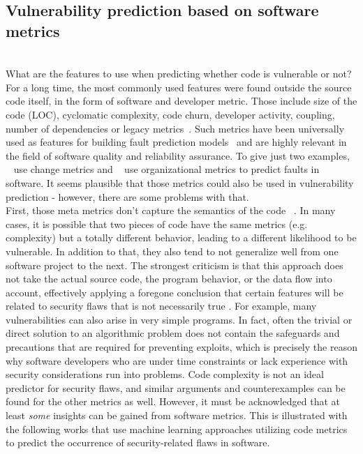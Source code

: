 \documentclass[
	a4paper,
	pagesize,
	pdftex,
	12pt,
	twoside, %
	BCOR=5mm, %
	ngerman,
	fleqn,
	final,
	]{scrartcl}
\begin{document}
\subsection{Vulnerability prediction based on software metrics}\mbox{}\\
What are the features to use when predicting whether code is vulnerable or not? For a long time, the most commonly used features were found outside the source code itself, in the form of software and developer metric. Those include size of the code (LOC), cyclomatic complexity, code churn, developer activity, coupling, number of dependencies or legacy metrics~\cite{Morrison.2015}. Such metrics have been universally used as features for building fault prediction models~\cite{Hall.2011} and are highly relevant in the field of software quality and reliability assurance.  To give just two examples, ~\cite{ACM.2008b} use change metrics and ~\cite{Nagappan.2008} use organizational metrics to predict faults in software. It seems plausible that those metrics could also be used in vulnerability prediction - however, there are some problems with that.\\
First, those meta metrics don't capture the semantics of the code ~\cite{Shin.2008}. In many cases, it is possible that two pieces of code have the same metrics (e.g. complexity) but a totally different behavior, leading to a different likelihood to be vulnerable. In addition to that, they also tend to not generalize well from one software project to the next. The strongest criticism is that this approach does not take the actual source code, the program behavior, or the data flow into account, effectively applying a foregone conclusion that certain features will be related to security flaws that is not necessarily true \citep{Hovsepyan.2012}. For example, many vulnerabilities can also arise in very simple programs. In fact, often the trivial or direct solution to an algorithmic problem does not contain the safeguards and precautions that are required for preventing exploits, which is precisely the reason why software developers who are under time constraints or lack experience with security considerations run into problems. Code complexity is not an ideal predictor for security flaws, and similar arguments and counterexamples can be found for the other metrics as well. However, it must be acknowledged that at least \textit{some} insights can be gained from software metrics. This is illustrated with the following works that use machine learning approaches utilizing code metrics to predict the occurrence of security-related flaws in software.\\
\end{document}
